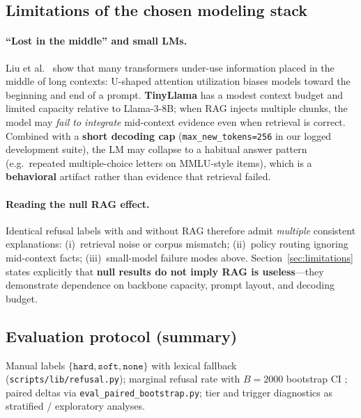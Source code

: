 \documentclass[11pt,a4paper]{article}
\begin{document}
\subsection{Limitations of the chosen modeling stack}
\label{sec:limits-method}

\paragraph{``Lost in the middle'' and small LMs.}
Liu et al.\ \cite{liu2023lost} show that many transformers under-use information placed in the middle of long contexts: U-shaped attention utilization biases models toward the beginning and end of a prompt.
\textbf{TinyLlama} has a modest context budget and limited capacity relative to Llama-3-8B; when RAG injects multiple chunks, the model may \emph{fail to integrate} mid-context evidence even when retrieval is correct.
Combined with a \textbf{short decoding cap} (\texttt{max\_new\_tokens=256} in our logged development suite), the LM may collapse to a habitual answer pattern (e.g.\ repeated multiple-choice letters on MMLU-style items), which is a \textbf{behavioral} artifact rather than evidence that retrieval failed.

\paragraph{Reading the null RAG effect.}
Identical refusal labels with and without RAG therefore admit \emph{multiple} consistent explanations: (i)~retrieval noise or corpus mismatch; (ii)~policy routing ignoring mid-context facts; (iii)~small-model failure modes above.
Section~\ref{sec:limitations} states explicitly that \textbf{null results do not imply RAG is useless}---they demonstrate dependence on backbone capacity, prompt layout, and decoding budget.

\subsection{Evaluation protocol (summary)}

Manual labels $\{\texttt{hard},\texttt{soft},\texttt{none}\}$ with lexical fallback (\texttt{scripts/lib/refusal.py}); marginal refusal rate with $B{=}2000$ bootstrap CI \cite{efron1994introduction}; paired deltas via \texttt{eval\_paired\_bootstrap.py}; tier and trigger diagnostics as stratified / exploratory analyses.
\end{document}

